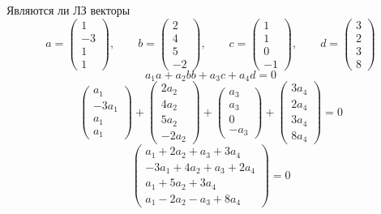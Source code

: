 Являются ли ЛЗ векторы
$$ a =
\begin{pmatrix}
	1 \\
    -3 \\
    1 \\
    1
\end{pmatrix}, \qquad b =
\begin{pmatrix}
	2 \\
    4 \\
    5 \\
    -2
\end{pmatrix}, \qquad c =
\begin{pmatrix}
	1 \\
    1 \\
    0 \\
    -1
\end{pmatrix}, \qquad d =
\begin{pmatrix}
	3 \\
    2 \\
    3 \\
    8
\end{pmatrix} $$
$$ a_1a + a_2bb + a_3c + a_4d = 0 $$
$$
\begin{pmatrix}
	a_1 \\
    -3a_1 \\
    a_1 \\
    a_1
\end{pmatrix} +
\begin{pmatrix}
	2a_2 \\
    4a_2 \\
    5a_2 \\
    -2a_2
\end{pmatrix} +
\begin{pmatrix}
	a_3 \\
    a_3 \\
    0 \\
    -a_3
\end{pmatrix} +
\begin{pmatrix}
	3a_4 \\
    2a_4 \\
    3a_4 \\
    8a_4
\end{pmatrix} = 0 $$
$$
\begin{pmatrix}
	a_1 + 2a_2 + a_3 + 3a_4 \\
    -3a_1 + 4a_2 + a_3 + 2a_4 \\
    a_1 + 5a_2 + 3a_4 \\
    a_1 - 2a_2 - a_3 + 8a_4
\end{pmatrix} = 0 $$
